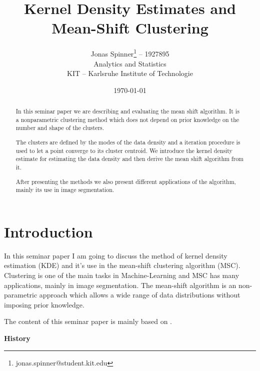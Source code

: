\documentclass{article}
\begin{document}
\title{Kernel Density Estimates and Mean-Shift Clustering}
\author{Jonas Spinner\thanks{jonas.spinner@student.kit.edu} \enspace -- 1927895\\
	Analytics and Statistics\\
	KIT -- Karlsruhe Institute of Technologie}
\date{\today}
\maketitle

\newpage

\tableofcontents

\newpage

\listoffigures

\listoftables

\listofalgorithms

\listofcodes


\newpage


\begin{abstract}
	In this seminar paper we are describing and evaluating the mean shift algorithm. It is a nonparametric clustering method which does not depend on prior knowledge on the number and shape of the clusters.
	
	The clusters are defined by the modes of the data density and a iteration procedure is used to let a point converge to its cluster centroid. We introduce the kernel density estimate for estimating the data density and then derive the mean shift algorithm from it.
	
	After presenting the methods we also present different applications of the algorithm, mainly its use in image segmentation.
\end{abstract}

\section{Introduction}

In this seminar paper I am going to discuss the method of kernel density estimation (KDE) and it's use in the mean-shift clustering algorithm (MSC). Clustering is one of the main tasks in Machine-Learning and MSC has many applications, mainly in image segmentation. The mean-shift algorithm is an non-parametric approach which allows a wide range of data distributions without imposing prior knowledge.

The content of this seminar paper is mainly based on \cite{Comaniciu.2002}.

\textbf{History}
\end{document}
